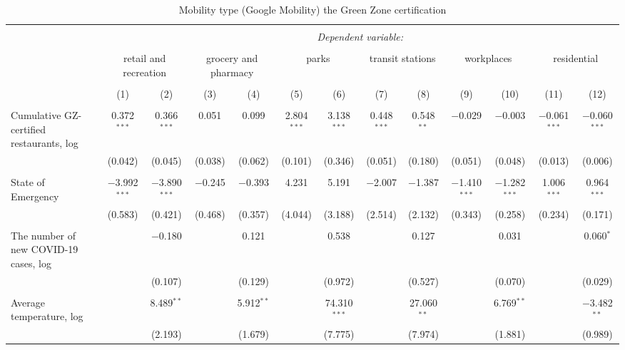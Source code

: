 
\begin{table}[!htbp] \centering 
  \caption{Mobility type (Google Mobility) the Green Zone certification} 
  \label{} 
\footnotesize 
\begin{tabular}{@{\extracolsep{-12pt}}lcccccccccccc} 
\\[-1.8ex]\hline 
\hline \\[-1.8ex] 
 & \multicolumn{12}{c}{\textit{Dependent variable:}} \\ 
\cline{2-13} 
\\[-1.8ex] & \multicolumn{2}{c}{retail and recreation} & \multicolumn{2}{c}{grocery and pharmacy} & \multicolumn{2}{c}{parks} & \multicolumn{2}{c}{transit stations} & \multicolumn{2}{c}{workplaces} & \multicolumn{2}{c}{residential} \\ 
\\[-1.8ex] & (1) & (2) & (3) & (4) & (5) & (6) & (7) & (8) & (9) & (10) & (11) & (12)\\ 
\hline \\[-1.8ex] 
 Cumulative GZ-certified restaurants, log & 0.372$^{***}$ & 0.366$^{***}$ & 0.051 & 0.099 & 2.804$^{***}$ & 3.138$^{***}$ & 0.448$^{***}$ & 0.548$^{**}$ & $-$0.029 & $-$0.003 & $-$0.061$^{***}$ & $-$0.060$^{***}$ \\ 
  & (0.042) & (0.045) & (0.038) & (0.062) & (0.101) & (0.346) & (0.051) & (0.180) & (0.051) & (0.048) & (0.013) & (0.006) \\ 
  & & & & & & & & & & & & \\ 
 State of Emergency & $-$3.992$^{***}$ & $-$3.890$^{***}$ & $-$0.245 & $-$0.393 & 4.231 & 5.191 & $-$2.007 & $-$1.387 & $-$1.410$^{***}$ & $-$1.282$^{***}$ & 1.006$^{***}$ & 0.964$^{***}$ \\ 
  & (0.583) & (0.421) & (0.468) & (0.357) & (4.044) & (3.188) & (2.514) & (2.132) & (0.343) & (0.258) & (0.234) & (0.171) \\ 
  & & & & & & & & & & & & \\ 
 The number of new COVID-19 cases, log &  & $-$0.180 &  & 0.121 &  & 0.538 &  & 0.127 &  & 0.031 &  & 0.060$^{*}$ \\ 
  &  & (0.107) &  & (0.129) &  & (0.972) &  & (0.527) &  & (0.070) &  & (0.029) \\ 
  & & & & & & & & & & & & \\ 
 Average temperature, log &  & 8.489$^{**}$ &  & 5.912$^{**}$ &  & 74.310$^{***}$ &  & 27.060$^{**}$ &  & 6.769$^{**}$ &  & $-$3.482$^{**}$ \\ 
  &  & (2.193) &  & (1.679) &  & (7.775) &  & (7.974) &  & (1.881) &  & (0.989) \\ 

\end{tabular}
\end{table}
